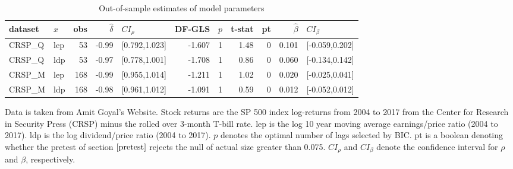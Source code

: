 \documentclass{article}
\begin{document}
\begin{table}[h!]
\small
\setlength\tabcolsep{5.3pt}
\centering
\caption{Out-of-sample estimates of model parameters}
\label{tab:oos}
\begin{threeparttable}
\begin{tabular}{llrrlrrrrrl}
  \hline
dataset & $x$ & obs & $\hat{\delta}$ & $CI_{\rho}$ & DF-GLS & $p$ &t-stat & pt & $\hat{\beta}$ & $CI_{\beta}$ \\ 
  \hline
  CRSP\_Q  & lep & 53 & -0.99 & [0.792,1.023] & -1.607 & 1 & 1.48 & 0 & 0.101 & [-0.059,0.202] \\ 
  CRSP\_Q & ldp & 53 & -0.97 & [0.778,1.001] & -1.708 & 1 & 0.86 & 0 & 0.060 & [-0.134,0.142] \\ 
  CRSP\_M & lep & 168 & -0.99 & [0.955,1.014] & -1.211 & 1 & 1.02 & 0 & 0.020 & [-0.025,0.041] \\ 
  CRSP\_M & ldp & 168 & -0.98 & [0.961,1.012] & -1.091 & 1 & 0.59 & 0 & 0.012 & [-0.052,0.012] \\ 
\hline
\end{tabular}
 \begin{tablenotes}
 \small
\item Data is taken from Amit Goyal’s Website. Stock returns are the SP 500 index log-returns from 2004 to 2017 from the Center for Research in Security Press (CRSP) minus the rolled over 3-month T-bill rate. lep is the log 10 year moving average earnings/price ratio (2004 to 2017). ldp is the log dividend/price ratio (2004 to 2017).
$p$ denotes the optimal number of lags selected by BIC. pt is a boolean denoting whether the pretest of section $\ref{pretest}$ rejects the null of actual size greater than 0.075. $CI_{\rho}$ and $CI_{\beta}$ denote the confidence interval for $\rho$ and $\beta$, respectively.
\end{tablenotes}
\end{threeparttable}
\end{table}
\end{document}
